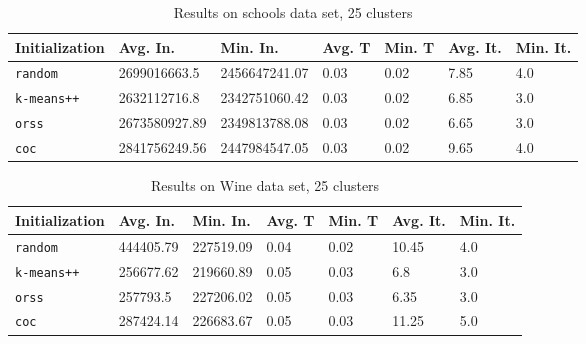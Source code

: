 \begin{table}[h]
	\begin{center}
		\begin{tabular}{|l|l|l|l|l|l|l|}
			\hline
			Initialization & Avg. In. & Min. In. & Avg. T & Min. T & Avg. It. & Min. It.\\\hline
			\texttt{random} & 2699016663.5 & 2456647241.07 & 0.03 & 0.02 & 7.85 & 4.0\\\hline
			\texttt{k-means++} & 2632112716.8 & 2342751060.42 & 0.03 & 0.02 & 6.85 & 3.0\\\hline
			\texttt{orss} & 2673580927.89 & 2349813788.08 & 0.03 & 0.02 & 6.65 & 3.0\\\hline
			\texttt{coc} & 2841756249.56 & 2447984547.05 & 0.03 & 0.02 & 9.65 & 4.0\\\hline
		\end{tabular}
		\caption{Results on schools data set, 25 clusters}
		\label{tbl:schools25}
	\end{center}
\end{table}

\begin{table}[h]
	\begin{center}
		\begin{tabular}{|l|l|l|l|l|l|l|}
			\hline
			Initialization & Avg. In. & Min. In. & Avg. T & Min. T & Avg. It. & Min. It.\\\hline
			\texttt{random} & 444405.79 & 227519.09 & 0.04 & 0.02 & 10.45 & 4.0\\\hline
			\texttt{k-means++} & 256677.62 & 219660.89 & 0.05 & 0.03 & 6.8 & 3.0\\\hline
			\texttt{orss} & 257793.5 & 227206.02 & 0.05 & 0.03 & 6.35 & 3.0\\\hline
			\texttt{coc} & 287424.14 & 226683.67 & 0.05 & 0.03 & 11.25 & 5.0\\\hline
		\end{tabular}
		\caption{Results on Wine data set, 25 clusters}
		\label{tbl:Wine25}
	\end{center}
\end{table}

